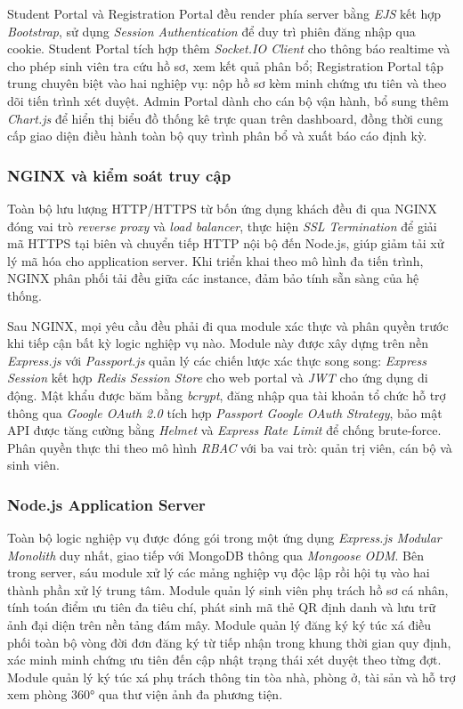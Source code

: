 \documentclass[../DoAn.tex]{subfiles}
\begin{document}
Student Portal và Registration Portal đều render phía server bằng \textit{EJS}
kết hợp \textit{Bootstrap}, sử dụng \textit{Session Authentication} để duy trì
phiên đăng nhập qua cookie. Student Portal tích hợp thêm \textit{Socket.IO Client}
cho thông báo realtime và cho phép sinh viên tra cứu hồ sơ, xem kết quả phân bổ;
Registration Portal tập trung chuyên biệt vào hai nghiệp vụ: nộp hồ sơ kèm minh
chứng ưu tiên và theo dõi tiến trình xét duyệt. Admin Portal dành cho cán bộ vận
hành, bổ sung thêm \textit{Chart.js} để hiển thị biểu đồ thống kê trực quan trên
dashboard, đồng thời cung cấp giao diện điều hành toàn bộ quy trình phân bổ và
xuất báo cáo định kỳ.

\subsubsection*{NGINX và kiểm soát truy cập}

Toàn bộ lưu lượng HTTP/HTTPS từ bốn ứng dụng khách đều đi qua NGINX đóng vai trò
\textit{reverse proxy} và \textit{load balancer}, thực hiện \textit{SSL Termination}
để giải mã HTTPS tại biên và chuyển tiếp HTTP nội bộ đến Node.js, giúp giảm tải
xử lý mã hóa cho application server. Khi triển khai theo mô hình đa tiến trình,
NGINX phân phối tải đều giữa các instance, đảm bảo tính sẵn sàng của hệ thống.

Sau NGINX, mọi yêu cầu đều phải đi qua module xác thực và phân quyền trước khi
tiếp cận bất kỳ logic nghiệp vụ nào. Module này được xây dựng trên nền
\textit{Express.js} với \textit{Passport.js} quản lý các chiến lược xác thực song
song: \textit{Express Session} kết hợp \textit{Redis Session Store} cho web portal
và \textit{JWT} cho ứng dụng di động. Mật khẩu được băm bằng \textit{bcrypt},
đăng nhập qua tài khoản tổ chức hỗ trợ thông qua \textit{Google OAuth 2.0} tích
hợp \textit{Passport Google OAuth Strategy}, bảo mật API được tăng cường bằng
\textit{Helmet} và \textit{Express Rate Limit} để chống brute-force. Phân quyền
thực thi theo mô hình \textit{RBAC} với ba vai trò: quản trị viên, cán bộ và
sinh viên.

\subsubsection*{Node.js Application Server}

Toàn bộ logic nghiệp vụ được đóng gói trong một ứng dụng \textit{Express.js
Modular Monolith} duy nhất, giao tiếp với MongoDB thông qua \textit{Mongoose ODM}.
Bên trong server, sáu module xử lý các mảng nghiệp vụ độc lập rồi hội tụ vào hai
thành phần xử lý trung tâm. Module quản lý sinh viên phụ trách hồ sơ cá nhân,
tính toán điểm ưu tiên đa tiêu chí, phát sinh mã thẻ QR định danh và lưu trữ
ảnh đại diện trên nền tảng đám mây. Module quản lý đăng ký ký túc xá điều phối
toàn bộ vòng đời đơn đăng ký từ tiếp nhận trong khung thời gian quy định, xác
minh minh chứng ưu tiên đến cập nhật trạng thái xét duyệt theo từng đợt. Module
quản lý ký túc xá phụ trách thông tin tòa nhà, phòng ở, tài sản và hỗ trợ xem
phòng 360° qua thư viện ảnh đa phương tiện.
\end{document}

